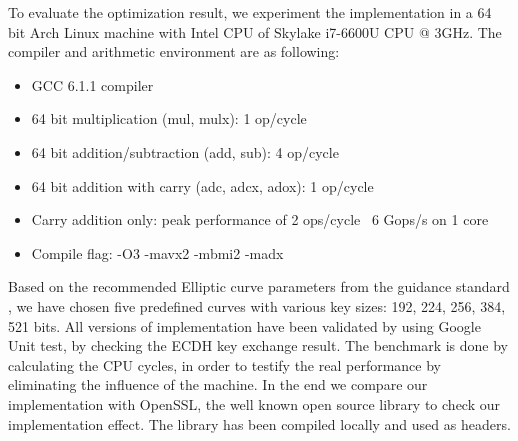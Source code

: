 To evaluate the optimization result, we experiment the implementation in a 64 bit Arch Linux machine with Intel CPU of Skylake i7-6600U CPU @ 3GHz. The compiler and arithmetic environment are as following: 

  \begin{itemize}
  \setlength\itemsep{0.5em}
  \item{GCC 6.1.1 compiler}
  \item{64 bit multiplication (mul, mulx): 1 op/cycle}
  \item{64 bit addition/subtraction (add, sub): 4 op/cycle}
  \item{64 bit addition with carry (adc, adcx, adox): 1 op/cycle}
  \item{Carry addition only: peak performance of 2 ops/cycle ~6 Gops/s on 1 core}
  \item{Compile flag: -O3 -mavx2 -mbmi2 -madx}
  \end{itemize}
  \setlength\itemsep{1.5em}
Based on the recommended Elliptic curve parameters from the guidance standard \cite{Brown:2010}, we have chosen five predefined curves with various key sizes: 192, 224, 256, 384, 521 bits. All versions of implementation have been validated by using Google Unit test, by checking the ECDH key exchange result. The benchmark is done by calculating the CPU cycles, in order to testify the real performance by eliminating the influence of the machine. In the end we compare our implementation with OpenSSL, the well known open source library to check our implementation effect. The library has been compiled locally and used as headers. 

